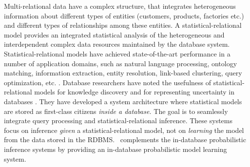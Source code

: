 Multi-relational data have a complex structure, that integrates heterogeneous information about different types of entities (customers, products, factories etc.) and different types of relationships among these entities. 
A statistical-relational model provides an integrated statistical analysis of the heterogeneous and interdependent complex data resources maintained by the database system. 
%
Statistical-relational models have achieved state-of-the-art performance in a number of application domains, such as natural language processing, ontology matching, information extraction, entity resolution, link-based clustering, query optimization, etc. %
\cite{Domingos2009,Niu2011,Getoor2001}.
%
Database researchers have noted the usefulness of statistical-relational models for knowledge discovery and for representing uncertainty in databases 
\cite{Singh2013,Wang2008}. 
%
They have developed a system architecture where statistical models are stored as first-class citizens {\em inside a database.} The goal is to seamlessly integrate query processing and statistical-relational inference. %
%
%
%
These systems focus  on inference {\em given} a statistical-relational model, not on {\em learning} the model from the data stored in the RDBMS. 
\FB\ complements the in-database probabilistic inference systems by providing an in-database probabilistic model learning system. 

